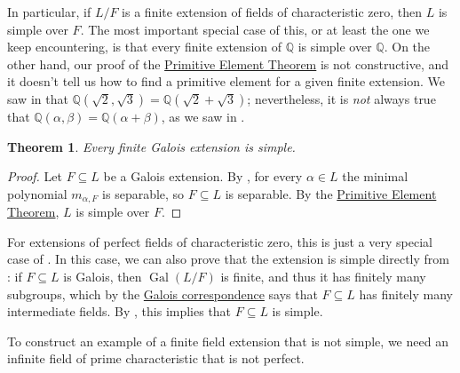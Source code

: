 \documentclass[12pt]{report}
\newtheorem{theorem}{Theorem}[chapter]
\numberwithin{equation}{section}
\numberwithin{theorem}{chapter}
\theoremstyle{definition}
\newtheorem*{basic properties}{Basic Properties}
\newtheorem*{Important Remark}{Important Remark}
\DeclareMathOperator{\Gal}{Gal}
\begin{document}
In particular, if $L/F$ is a finite extension of fields of characteristic zero, then $L$ is simple over $F$.
The most important special case of this, or at least the one we keep encountering, is that every finite extension of $\mathbb{Q}$ is simple over $\mathbb{Q}$. On the other hand, our proof of the \hyperref[primitive element theorem]{Primitive Element Theorem} is not constructive, and it doesn't tell us how to find a primitive element for a given finite extension. 
We saw in  that $\mathbb{Q}(\sqrt{2},\sqrt{3}) = \mathbb{Q}(\sqrt{2}+\sqrt{3})$; nevertheless, it is \emph{not} always true that $\mathbb{Q}(\alpha, \beta) = \mathbb{Q}(\alpha+\beta)$, as we saw in .


\begin{theorem}
	Every finite Galois extension is simple.
\end{theorem}


\begin{proof}
	Let $F \subseteq L$ be a Galois extension. By , for every $\alpha \in L$ the minimal polynomial $m_{\alpha,F}$ is separable, so $F \subseteq L$ is separable. By the \hyperref[primitive element theorem]{Primitive Element Theorem}, $L$ is simple over $F$.
\end{proof}

For extensions of perfect fields of characteristic zero, this is just a very special case of . In this case, we can also prove that the extension is simple directly from : if $F \subseteq L$ is Galois, then $\Gal(L/F)$ is finite, and thus it has finitely many subgroups, which by the \hyperref[Fundamental Theorem of Galois Theory]{Galois correspondence} says that $F \subseteq L$ has finitely many intermediate fields. By , this implies that $F \subseteq L$ is simple.


To construct an example of a finite field extension that is not simple, we need an infinite field of prime characteristic that is not perfect.
\end{document}
